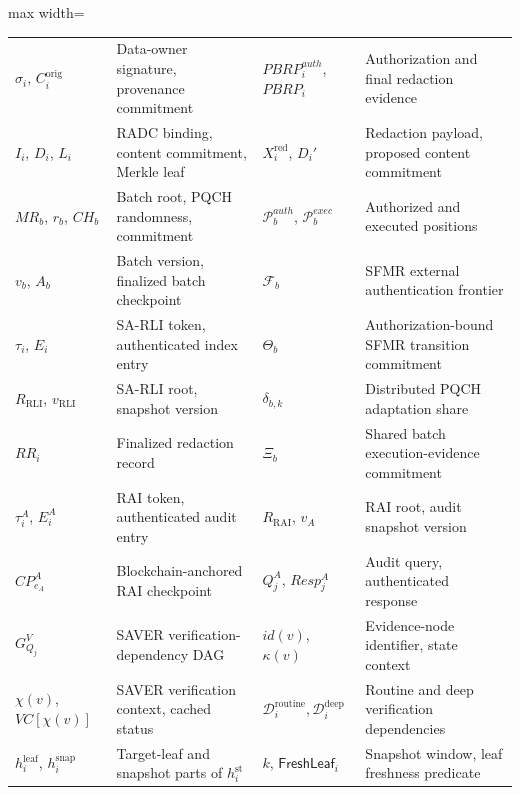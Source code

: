 \documentclass[lettersize,journal]{IEEEtran}
\begin{document}
\begin{table}[t]
\begin{adjustbox}{max width=\textwidth}
\begin{tabular}{@{}ll@{\quad}ll@{}}
$\sigma_i$, $C_i^{\mathrm{orig}}$
& Data-owner signature, provenance commitment &
$PBRP_i^{auth}$, $PBRP_i$
& Authorization and final redaction evidence\\

$I_i$, $D_i$, $L_i$
& RADC binding, content commitment, Merkle leaf &
$X_i^{\mathrm{red}}$, $D_i'$
& Redaction payload, proposed content commitment\\

$MR_b$, $r_b$, $CH_b$
& Batch root, PQCH randomness, commitment &
$\mathcal{P}_b^{auth}$, $\mathcal{P}_b^{exec}$
& Authorized and executed positions\\

$v_b$, $A_b$
& Batch version, finalized batch checkpoint &
$\mathcal{F}_b$
& SFMR external authentication frontier\\

$\tau_i$, $E_i$
& SA-RLI token, authenticated index entry &
$\Theta_b$
& Authorization-bound SFMR transition commitment\\

$R_{\mathrm{RLI}}$, $v_{\mathrm{RLI}}$
& SA-RLI root, snapshot version &
$\delta_{b,k}$
& Distributed PQCH adaptation share\\

$RR_i$
& Finalized redaction record &
$\Xi_b$
& Shared batch execution-evidence commitment\\

$\tau_i^A$, $E_i^A$
& RAI token, authenticated audit entry &
$R_{\mathrm{RAI}}$, $v_A$
& RAI root, audit snapshot version\\

$CP_{e_A}^A$
& Blockchain-anchored RAI checkpoint &
$Q_j^A$, $Resp_j^A$
& Audit query, authenticated response\\

$G_{Q_j}^{V}$
& SAVER verification-dependency DAG &
$id(v)$, $\kappa(v)$
& Evidence-node identifier, state context\\

$\chi(v)$, $VC[\chi(v)]$
& SAVER verification context, cached status &
$\mathcal{D}_i^{\mathrm{routine}},
 \mathcal{D}_i^{\mathrm{deep}}$
& Routine and deep verification dependencies\\

\textcolor{e1}{$h_i^{\mathrm{leaf}}$, $h_i^{\mathrm{snap}}$}
& \textcolor{e1}{Target-leaf and snapshot parts of $h_i^{\mathrm{st}}$} &
\textcolor{e1}{$k$, $\mathsf{FreshLeaf}_i$}
& \textcolor{e1}{Snapshot window, leaf freshness predicate}\\


\end{tabular}
\end{adjustbox}
\end{table}
\end{document}
